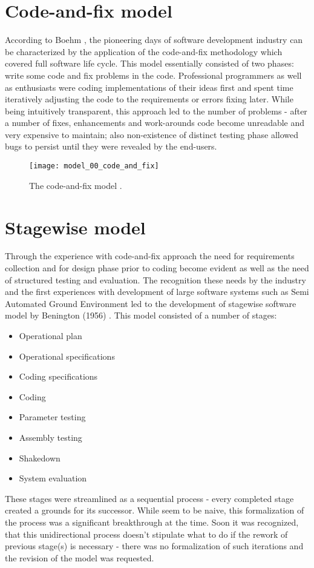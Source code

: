 \section{Code-and-fix model}
According to Boehm \cite{citeulike:10002126}, the pioneering days of software development 
industry can be characterized by the application of the code-and-fix methodology
which covered full software life cycle. This model essentially consisted of two phases:
write some code and fix problems in the code. Professional programmers as well as enthusiasts 
were coding implementations of their ideas first and spent time iteratively adjusting the 
code to the requirements or errors fixing later. While being intuitively transparent, this 
approach led to the number of problems - after a number of fixes, enhancements and 
work-arounds code become unreadable and very expensive to maintain; also non-existence of
distinct testing phase allowed bugs to persist until they were revealed by the end-users.

\begin{figure}[tbp]
   \centering
   \texttt{[image: model\_00\_code\_and\_fix]}
   \caption{The code-and-fix model \cite{citeulike:10002126}.}
   \label{fig:code_fix_model}
\end{figure}

\section{Stagewise model}
Through the experience with code-and-fix approach the need for requirements collection and 
for design phase prior to coding become evident as well as the need of structured 
testing and evaluation. The recognition these needs by the industry and the first experiences
with development of large software systems such as Semi Automated Ground 
Environment \cite{citeulike:10004001} \cite{citeulike:10004037} led to the development 
of stagewise software model by Benington (1956) \cite{citeulike:10004032}. 
This model consisted of a number of stages:
\begin{itemize}
 \item Operational plan
 \item Operational specifications
 \item Coding specifications
 \item Coding
 \item Parameter testing
 \item Assembly testing
 \item Shakedown
 \item System evaluation
\end{itemize}
These stages were streamlined as a sequential process - every completed stage created a
grounds for its successor. While seem to be naive, this formalization of the process was a 
significant breakthrough at the time. Soon it was recognized, that this unidirectional process
doesn't stipulate what to do if the rework of previous stage(s) is necessary - there was 
no formalization of such iterations and the revision of the model was requested.

